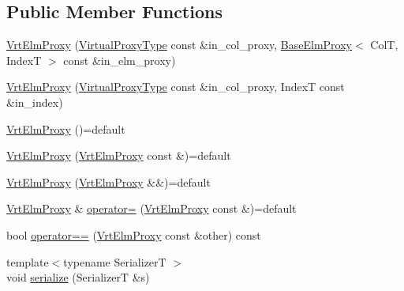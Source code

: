 \subsection*{Public Member Functions}
\begin{DoxyCompactItemize}
\item 
\hyperlink{structvt_1_1vrt_1_1collection_1_1_vrt_elm_proxy_abf99f4ab16dd0daf6e732171032e9a71}{Vrt\+Elm\+Proxy} (\hyperlink{namespacevt_a1b417dd5d684f045bb58a0ede70045ac}{Virtual\+Proxy\+Type} const \&in\+\_\+col\+\_\+proxy, \hyperlink{structvt_1_1vrt_1_1collection_1_1_base_elm_proxy}{Base\+Elm\+Proxy}$<$ ColT, IndexT $>$ const \&in\+\_\+elm\+\_\+proxy)
\item 
\hyperlink{structvt_1_1vrt_1_1collection_1_1_vrt_elm_proxy_a99d6e37bddf85ab0b3030ce7ab519f04}{Vrt\+Elm\+Proxy} (\hyperlink{namespacevt_a1b417dd5d684f045bb58a0ede70045ac}{Virtual\+Proxy\+Type} const \&in\+\_\+col\+\_\+proxy, IndexT const \&in\+\_\+index)
\item 
\hyperlink{structvt_1_1vrt_1_1collection_1_1_vrt_elm_proxy_a9dcec470fca637dedf608a402facca14}{Vrt\+Elm\+Proxy} ()=default
\item 
\hyperlink{structvt_1_1vrt_1_1collection_1_1_vrt_elm_proxy_ac0ac82f67b1a4d2e3cbd52ebdf32cc7a}{Vrt\+Elm\+Proxy} (\hyperlink{structvt_1_1vrt_1_1collection_1_1_vrt_elm_proxy}{Vrt\+Elm\+Proxy} const \&)=default
\item 
\hyperlink{structvt_1_1vrt_1_1collection_1_1_vrt_elm_proxy_a451958f72d1dc1a5633ada75558cc5f5}{Vrt\+Elm\+Proxy} (\hyperlink{structvt_1_1vrt_1_1collection_1_1_vrt_elm_proxy}{Vrt\+Elm\+Proxy} \&\&)=default
\item 
\hyperlink{structvt_1_1vrt_1_1collection_1_1_vrt_elm_proxy}{Vrt\+Elm\+Proxy} \& \hyperlink{structvt_1_1vrt_1_1collection_1_1_vrt_elm_proxy_a74d7dc399b099347ebb01ece6a7ab025}{operator=} (\hyperlink{structvt_1_1vrt_1_1collection_1_1_vrt_elm_proxy}{Vrt\+Elm\+Proxy} const \&)=default
\item 
bool \hyperlink{structvt_1_1vrt_1_1collection_1_1_vrt_elm_proxy_aaa0d1284499b6714cc4462ecc03580bb}{operator==} (\hyperlink{structvt_1_1vrt_1_1collection_1_1_vrt_elm_proxy}{Vrt\+Elm\+Proxy} const \&other) const
\item 
{\footnotesize template$<$typename SerializerT $>$ }\\void \hyperlink{structvt_1_1vrt_1_1collection_1_1_vrt_elm_proxy_a0f076b094fe6bca6bf27df607d79ccf0}{serialize} (SerializerT \&s)
\end{DoxyCompactItemize}
